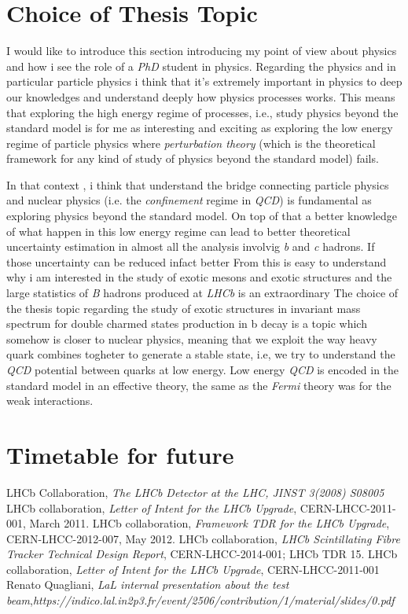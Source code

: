 \documentclass[paper=a4, fontsize=10pt]{scrartcl}
\numberwithin{equation}{section}		%
\numberwithin{figure}{section}			%
\numberwithin{table}{section}				%
\begin{document}
\section{Choice of Thesis Topic}
I would like to introduce this section introducing my point of view about physics and how i see the role of a \textit{PhD} student in physics. Regarding the physics and in particular particle physics i think that it's extremely important in physics to deep our knowledges and understand deeply how physics processes works. This means that exploring the high energy regime of processes, i.e., study physics beyond the standard model is for me as interesting and exciting as exploring the low energy regime of particle physics where \textit{perturbation theory} (which is the theoretical framework for any kind of study of physics beyond the standard model) fails.

 In that context , i think that understand the bridge connecting particle physics and nuclear physics (i.e. the \textit{confinement} regime in \textit{QCD}) is fundamental as exploring physics beyond the standard model.
On top of that a better knowledge of what happen in this low energy regime can lead to better theoretical uncertainty estimation in almost all the analysis involvig \textit{b} and \textit{c} hadrons. If those uncertainty can be reduced infact better  From this is easy to understand why i am interested in the study of exotic mesons and exotic structures and the large statistics of \textit{B} hadrons produced at \textit{LHCb} is an extraordinary
The choice of the thesis topic regarding the study of exotic structures in invariant mass spectrum for double charmed states production in b decay is a topic which somehow is closer to nuclear physics, meaning that we exploit the way heavy quark combines togheter to generate a stable state, i.e, we try to understand the \textit{QCD} potential between quarks at low energy. Low energy \textit{QCD} is encoded in the standard model in an effective theory, the same as the \textit{Fermi} theory was for the weak interactions.

\section{Timetable for future}



\begin{thebibliography}{100}
 LHCb Collaboration, \textit{The LHCb Detector at the LHC, JINST 3(2008) S08005}
 LHCb collaboration, \textit{Letter of Intent for the LHCb Upgrade}, CERN-LHCC-2011-001, March 2011.
 LHCb collaboration, \textit{Framework TDR for the LHCb Upgrade}, CERN-LHCC-2012-007, May 2012.
 LHCb collaboration, \textit{LHCb Scintillating Fibre Tracker Technical Design Report}, CERN-LHCC-2014-001; LHCb TDR 15.
 LHCb collaboration, \textit{Letter of Intent for the LHCb Upgrade}, CERN-LHCC-2011-001
 Renato Quagliani, \textit{LaL internal presentation about the test beam},\emph{https://indico.lal.in2p3.fr/event/2506/contribution/1/material/slides/0.pdf}

\end{thebibliography}
\end{document}
